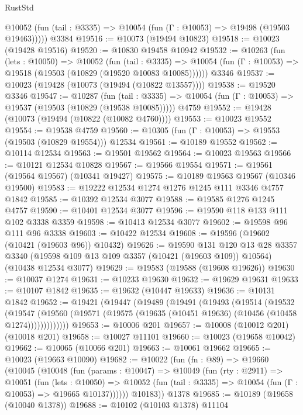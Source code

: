 \begin{lexlean}{RustStd}
\begin{coremodule}
      @10052 (fun (tail : @3335) => @10054 (fun (Γ : @10053) => @19498 (@19503 @19463)))))
    @3384
@19516 := @10073 (@19494 @10823)
@19518 := @10023 (@19428 @19516)
@19520 := @10830 @19458 @10942
@19532 := @10263
    (fun (lets : @10050) =>
    @10052
      (fun (tail : @3335) =>
      @10054 (fun (Γ : @10053) => @19518 (@19503 (@10829 (@19520 @10083 @10085))))))
    @3346
@19537 := @10023 (@19428 (@10073 (@19494 (@10822 @13557))))
@19538 := @19520 @3346
@19547 := @10287
    (fun (tail : @3335) => @10054 (fun (Γ : @10053) => @19537 (@19503 (@10829 (@19538 @10085)))))
    @4759
@19552 := @19428 (@10073 (@19494 (@10822 (@10082 @4760))))
@19553 := @10023 @19552
@19554 := @19538 @4759
@19560 := @10305 (fun (Γ : @10053) => @19553 (@19503 (@10829 @19554))) @12534
@19561 := @10189 @19552
@19562 := @10114 @12534
@19563 := @19501 @19562
@19564 := @10023 @19563
@19566 := @10121 @12534 @10828
@19567 := @19566 @19554
@19571 := @19561 (@19564 @19567) (@10341 @19427)
@19575 := @10189 @19563 @19567 (@10346 @19500)
@19583 := @19222 @12534 @1274 @1276 @1245 @111 @3346 @4757 @1842
@19585 := @10392 @12534 @3077
@19588 := @19585 @1276 @1245 @4757
@19590 := @10401 @12534 @3077
@19596 := @19590 @118 @133 @111 @102 @3338 @3359
@19598 := @10413 @12534 @3077
@19602 := @19598 @96 @111 @96 @3338
@19603 := @10422 @12534
@19608 := @19596 (@19602 (@10421 (@19603 @96)) @10432)
@19626 := @19590
    @131
    @120
    @13
    @28
    @3357
    @3340
    (@19598 @109 @13 @109 @3357 (@10421 (@19603 @109)) @10564)
    (@10438 @12534 @3077)
@19629 := @19583 (@19588 (@19608 @19626))
@19630 := @10037 @1274
@19631 := @10233 @19630
@19632 := @19629 @19631
@19633 := @10107 @1842
@19635 := @19632 (@10447 @19633)
@19636 := @10131 @1842
@19652 := @19421
    (@19447
      (@19489
        (@19491
          (@19493
            (@19514
              (@19532
                (@19547
                  (@19560 (@19571 (@19575 (@19635 (@10451 @19636) (@10456 (@10458 @1274)))))))))))))
@19653 := @10006 @201
@19657 := @10008 (@10012 @201) (@10018 @201)
@19658 := @10027 @11101
@19660 := @10023 (@19658 @10042)
@19662 := @10065 (@10066 @201)
@19663 := @10061 @19662
@19665 := @10023 (@19663 @10090)
@19682 := @10022
    (fun (fn : @89) =>
    @19660
      (@10045
        (@10048
          (fun (params : @10047) =>
          @10049
            (fun (rty : @2911) =>
            @10051
              (fun (lets : @10050) =>
              @10052 (fun (tail : @3335) => @10054 (fun (Γ : @10053) => @19665 @10137))))))
        @10183))
    @1378
@19685 := @10189 (@19658 (@10040 @1378))
@19688 := @10102 (@10103 @1378) @11104

\end{coremodule}
\end{lexlean}
